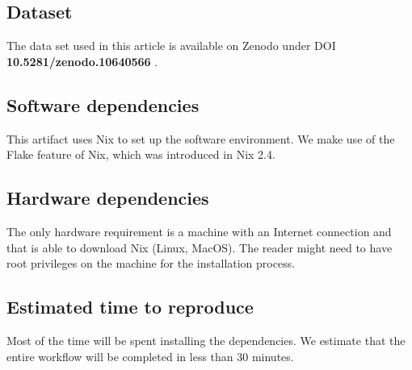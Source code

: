 \documentclass[sigconf,natbib=false]{acmart}
\begin{document}
\subsection{Dataset}

The data set used in this article is available on Zenodo under DOI \textbf{ 10.5281/zenodo.10640566} \cite{guilloteau_2024_10640566}.

\subsection{Software dependencies}

This artifact uses Nix to set up the software environment.
We make use of the Flake feature of Nix, which was introduced in Nix 2.4.

\subsection{Hardware dependencies}

The only hardware requirement is a machine with an Internet connection and that is able to download Nix (Linux, MacOS).
The reader might need to have root privileges on the machine for the installation process.

\subsection{Estimated time to reproduce}

Most of the time will be spent installing the dependencies.
We estimate that the entire workflow will be completed in less than 30 minutes.
\end{document}
